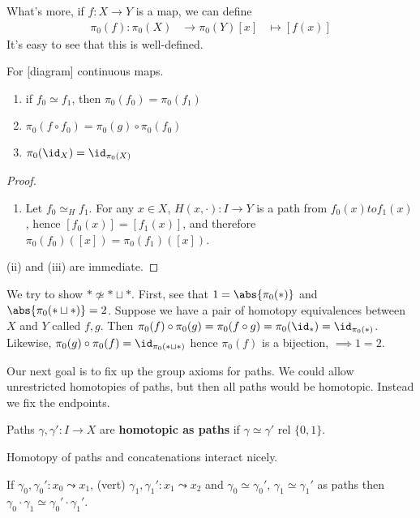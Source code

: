 \documentclass{article}
\numberwithin{nthm}{subsection}
\begin{document}
What's more, if $f: X \to Y$ is a map, we can define
\begin{align*}
    \pi_0(f): \pi_0(X) &\to \pi_0(Y)
    [x] &\mapsto [f(x)]
\end{align*}
It's easy to see that this is well-defined.

\begin{nprop}
    For [diagram] continuous maps.
    \begin{enumerate}[label=(\roman*)]
        \item if $f_0 \simeq f_1$, then $\pi_0(f_0) = \pi_0(f_1)$
        \item $\pi_0(f \circ f_0) = \pi_0(g) \circ \pi_0(f_0)$
        \item $\pi_0(\id_X) = \id_{\pi_0(X)}$
    \end{enumerate}
\end{nprop}

\begin{proof}
    \leavevmode
    \begin{enumerate}[label=(\roman*)]
        \item Let $f_0 \simeq_H f_1$. For any $x \in X$, $H(x, \cdot): I \to Y$ is a path from $f_0(x) to f_1(x)$, hence $[f_0(x)] = [f_1(x)]$, and therefore $\pi_0(f_0)([x]) = \pi_0(f_1)([x])$.
    \end{enumerate}
    (ii) and (iii) are immediate.
\end{proof}

\begin{eg}
    We try to show $* \not \simeq * \sqcup *$.  First, see that $1 = \abs{\pi_0(*)}$ and $\abs{\pi_0(* \sqcup *)} = 2$. Suppose we have a pair of homotopy equivalences between $X$ and $Y$ called $f, g$.
    Then $\pi_0(f) \circ \pi_0(g) = \pi_0(f \circ g) = \pi_0(\id_*) = \id_{\pi_0(*)}$. Likewise, $\pi_0(g) \circ \pi_0(f) = \id_{\pi_0(* \sqcup *)}$ hence $\pi_0(f)$ is a bijection, $\implies 1=2$.
\end{eg}

Our next goal is to fix up the group axioms for paths. We could allow unrestricted homotopies of paths, but then all paths would be homotopic. Instead we fix the endpoints.

Paths $\gamma, \gamma': I \to X$ are \textbf{homotopic as paths} if $\gamma \simeq \gamma'$ rel $\{0, 1\}$.

Homotopy of paths and concatenations interact nicely.

\begin{nlemma}
    If $\gamma_0, \gamma_0': x_0 \leadsto x_1$, (vert) $\gamma_1, \gamma_1': x_1 \leadsto x_2$ and $\gamma_0 \simeq \gamma_0'$, $\gamma_1 \simeq \gamma_1'$ as paths then $\gamma_0 \cdot \gamma_1 \simeq \gamma_0' \cdot \gamma_1'$.
\end{nlemma}
\end{document}
